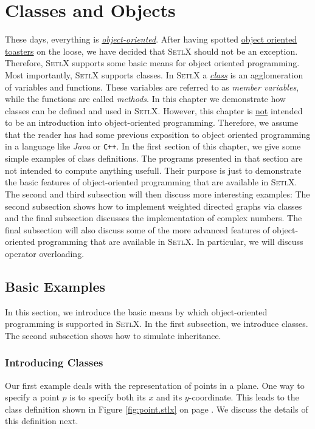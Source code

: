 \chapter{Classes and Objects}
These days, everything is
\href{http://en.wikipedia.org/wiki/Object-oriented_programming}{\emph{object-oriented}}.  
After having spotted
\href{http://www.gi-news.com/classic-jokes/180-the-object-oriented-toaster}{object oriented toasters}  
on the loose, we have decided that \textsc{SetlX} should not be an exception.  Therefore,
\textsc{SetlX} supports some basic means for object oriented programming.  Most importantly,
\textsc{SetlX} supports classes.  In \textsc{SetlX} a  
\href{http://en.wikipedia.org/wiki/Class_(computer_programming)}{\emph{class}}
is an agglomeration of variables and functions.  These variables are referred to as 
\emph{member variables}, while the functions are called \emph{methods}.  
In this chapter we demonstrate how classes can be defined and used in \textsc{SetlX}.  
However, this chapter is \underline{not} intended to be an introduction into object-oriented
programming.  Therefore,  we assume that the reader 
has had some previous exposition to object oriented programming in a language like \textsl{Java} or
\texttt{C++}.   In the first section of this chapter, we give some simple examples of class definitions.
The programs presented in that section are not intended to compute anything usefull.  Their
purpose is just to demonstrate the basic features of object-oriented programming that are available
in \textsc{SetlX}.  The second  and third subsection will then discuss more interesting examples:
The second subsection shows how to implement weighted directed graphs via classes and the final
subsection discusses the implementation of complex numbers.  The final subsection will also discuss
some of the more advanced features of object-oriented programming that are available in
\textsc{SetlX}.  In particular, we will discuss operator overloading.

\section{Basic Examples}
In this section, we introduce the basic means by which object-oriented programming is supported in
\textsc{SetlX}.  In the first subsection, we introduce classes.  The second subsection shows how to
simulate inheritance.

\subsection{Introducing Classes}
Our first example deals with the representation of points in a plane.  One way to specify a point
$p$ is to specify both its $x$ and its $y$-coordinate.  This leads to the class definition shown in
Figure \ref{fig:point.stlx} on page \pageref{fig:point.stlx}.  We discuss the details of this
definition next.


